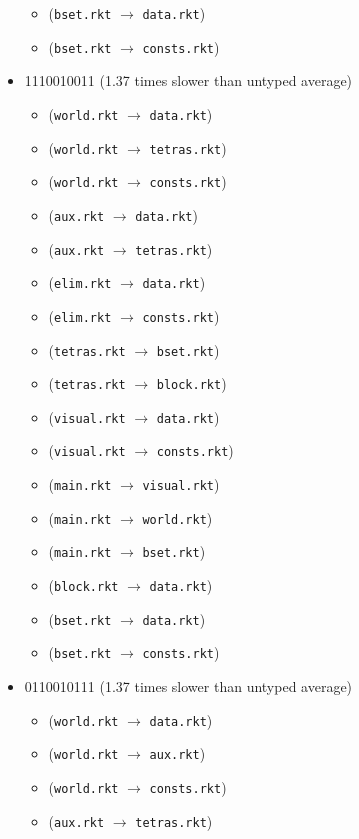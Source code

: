 \documentclass{article}
\newcommand{\mono}[1]{\texttt{#1}}
\begin{document}
\begin{itemize}
\begin{itemize}
  \item (\mono{bset.rkt} $\rightarrow$ \mono{data.rkt})
  \item (\mono{bset.rkt} $\rightarrow$ \mono{consts.rkt})
  \end{itemize}
\item 1110010011 (1.37 times slower than untyped average)
  \begin{itemize}
  \item (\mono{world.rkt} $\rightarrow$ \mono{data.rkt})
  \item (\mono{world.rkt} $\rightarrow$ \mono{tetras.rkt})
  \item (\mono{world.rkt} $\rightarrow$ \mono{consts.rkt})
  \item (\mono{aux.rkt} $\rightarrow$ \mono{data.rkt})
  \item (\mono{aux.rkt} $\rightarrow$ \mono{tetras.rkt})
  \item (\mono{elim.rkt} $\rightarrow$ \mono{data.rkt})
  \item (\mono{elim.rkt} $\rightarrow$ \mono{consts.rkt})
  \item (\mono{tetras.rkt} $\rightarrow$ \mono{bset.rkt})
  \item (\mono{tetras.rkt} $\rightarrow$ \mono{block.rkt})
  \item (\mono{visual.rkt} $\rightarrow$ \mono{data.rkt})
  \item (\mono{visual.rkt} $\rightarrow$ \mono{consts.rkt})
  \item (\mono{main.rkt} $\rightarrow$ \mono{visual.rkt})
  \item (\mono{main.rkt} $\rightarrow$ \mono{world.rkt})
  \item (\mono{main.rkt} $\rightarrow$ \mono{bset.rkt})
  \item (\mono{block.rkt} $\rightarrow$ \mono{data.rkt})
  \item (\mono{bset.rkt} $\rightarrow$ \mono{data.rkt})
  \item (\mono{bset.rkt} $\rightarrow$ \mono{consts.rkt})
  \end{itemize}
\item 0110010111 (1.37 times slower than untyped average)
  \begin{itemize}
  \item (\mono{world.rkt} $\rightarrow$ \mono{data.rkt})
  \item (\mono{world.rkt} $\rightarrow$ \mono{aux.rkt})
  \item (\mono{world.rkt} $\rightarrow$ \mono{consts.rkt})
  \item (\mono{aux.rkt} $\rightarrow$ \mono{tetras.rkt})

\end{itemize}
\end{itemize}
\end{document}
